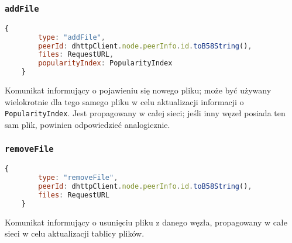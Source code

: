 % 

\subsubsection{\texttt{addFile}}
\begin{lstlisting}[language=javascript]
    {
        type: "addFile",
        peerId: dhttpClient.node.peerInfo.id.toB58String(),
        files: RequestURL,
        popularityIndex: PopularityIndex
    }
\end{lstlisting}

Komunikat informujący o pojawieniu się nowego pliku; może być używany wielokrotnie dla tego samego pliku w celu aktualizacji informacji o \texttt{PopularityIndex}. Jest propagowany w całej sieci; jeśli inny węzeł posiada ten sam plik, powinien odpowiedzieć analogicznie.


% 

\subsubsection{\texttt{removeFile}}
\begin{lstlisting}[language=javascript]
    {
        type: "removeFile",
        peerId: dhttpClient.node.peerInfo.id.toB58String(),
        files: RequestURL
    }
\end{lstlisting}

Komunikat informujący o usunięciu pliku z danego węzła, propagowany w całe sieci w celu aktualizacji tablicy plików.
